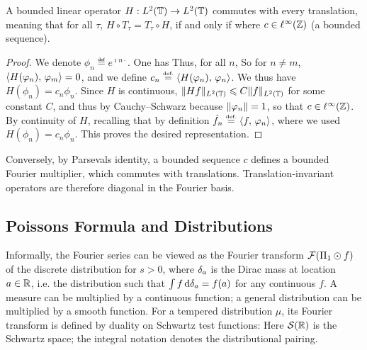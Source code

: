 \begin{prop}\label{prop-ti-convol-l2}
	A bounded linear operator $H : L^2(\mathbb{T}) \rightarrow L^2(\mathbb{T})$ commutes with every translation, meaning that for all $\tau$, $H \circ T_\tau = T_\tau \circ H$, if and only if
	where $c \in \ell^\infty(\mathbb{Z})$ (a bounded sequence).
\end{prop}
\begin{proof}
	We denote $\phi_n \eqdef e^{\imath n \cdot}$. 
	One has
	Thus, for all $n$, 
	So for $n \neq m$, $\langle H(\varphi_n),\,\varphi_m\rangle = 0$, and we define $c_n \stackrel{\mbox{\upshape\tiny def.}}{=} \langle H(\varphi_n),\,\varphi_n\rangle$.
	We thus have $H(\phi_n) = c_n \phi_n$.
	Since $H$ is continuous, $\lVert Hf\rVert_{L^2(\mathbb{T})} \leqslant C \lVert f\rVert_{L^2(\mathbb{T})}$ for some constant $C$, and thus
	by Cauchy--Schwarz
	because $\lVert\varphi_n\rVert=1$, so that $c \in \ell^\infty(\mathbb{Z})$.
	By continuity of $H$, recalling that by definition $\hat f_n \stackrel{\mbox{\upshape\tiny def.}}{=} \langle f,\,\varphi_n\rangle$, 
	where we used $H(\phi_n) = c_n \phi_n$. This proves the desired representation.
\end{proof}

Conversely, by Parseval\textquotesingle s identity, a bounded sequence $c$ defines a bounded Fourier multiplier, which commutes with translations. Translation-invariant operators are therefore diagonal in the Fourier basis.

\subsection{Poisson\textquotesingle s Formula and Distributions}

Informally, the Fourier series
can be viewed as the Fourier transform $\mathcal{F}( \Pi_1 \odot f )$ of the discrete distribution
for $s>0$,
where $\delta_a$ is the Dirac mass at location $a \in \mathbb{R}$, i.e. the distribution such that $\int f\,\mathrm{d}\delta_a=f(a)$ for any continuous $f$. A measure can be multiplied by a continuous function; a general distribution can be multiplied by a smooth function. For a tempered distribution $\mu$, its Fourier transform is defined by duality on Schwartz test functions:
Here $\mathcal{S}(\mathbb{R})$ is the Schwartz space; the integral notation denotes the distributional pairing.

